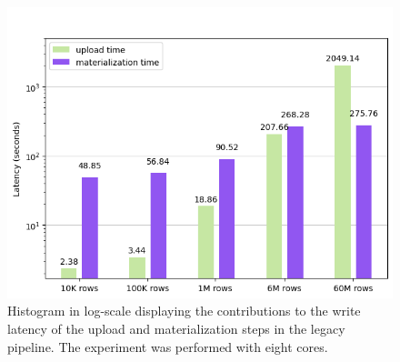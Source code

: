 \begin{figure}
\begin{minipage}[b]{\textwidth}
        \includegraphics[width=\textwidth]{figures/99-appendix/results-diagrams/write/hudi_upload_materialize/hudi_virtualiz_8_core.png}
        \caption[Histogram of the write on legacy pipeline - Time breakdown - 8 CPU cores]{Histogram in log-scale displaying the contributions to the write latency of the upload and materialization steps in the legacy pipeline. The experiment was performed with eight  cores.}
        \label{fig:appx_hudi_virtualiz_breakdown_8_core}
    \end{minipage}
\end{figure}
